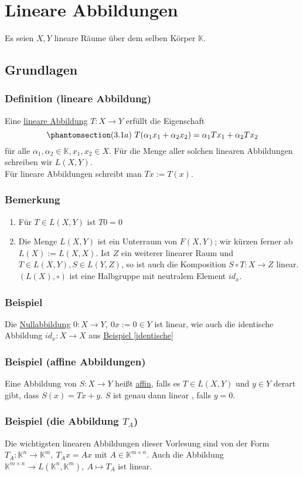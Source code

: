 \section{Lineare Abbildungen}
Es seien $X,Y$ lineare Räume über dem selben Körper $\mathbb{K}$.
\subsection{Grundlagen}
\subsubsection{Definition (lineare Abbildung)}
Eine \underline{lineare Abbildung} $T: X\rightarrow Y$ erfüllt die Eigenschaft
\[\phantomsection\label{3.1a}(3.1a)\ T(\alpha _1x_1+\alpha _2x_2)=\alpha _1Tx_1+\alpha _2Tx_2\]
für alle $\alpha _1,\alpha _2\in\mathbb{K},x_1,x_2\in X$.  Für die Menge aller solchen linearen Abbildungen schreiben wir $L(X,Y)$.\\
Für lineare Abbildungen schreibt man $Tx:=T(x)$.
\subsubsection{Bemerkung}
\renewcommand{\labelenumi}{(\arabic{enumi})}
\begin{enumerate}
\item Für $T\in L(X,Y)$ ist $T0=0$
\item Die Menge $L(X,Y)$ ist ein Unterraum von $F(X,Y)$; wir kürzen ferner ab $L(X):=L(X,X)$.  Ist $Z$ ein weiterer linearer Raum und $T\in L(X,Y),S\in L(Y,Z)$, so ist auch die Komposition $S\circ T:X\rightarrow Z$ linear. $(L(X),\circ )$ ist eine Halbgruppe mit neutralem Element $id_x$.
\end{enumerate}
\subsubsection{Beispiel}
Die \underline{Nullabbildung} $0:X\rightarrow Y,\ 0x:=0\in Y$ ist linear, wie auch die identische Abbildung $id_x:X\rightarrow X$ aus \hyperref[identische]{Beispiel \ref*{identische}}
\subsubsection{Beispiel (affine Abbildungen)}
Eine Abbildung von $S:X\rightarrow Y$ heißt \underline{affin}, falls es $T\in L(X,Y)$ und $y\in Y$ derart gibt, dass $S(x)=Tx+y$.  $S$ ist genau dann linear , falls $y=0$.
\subsubsection{Beispiel (die Abbildung $T_A$)}
\label{3.1.5}
Die wichtigsten linearen Abbildungen dieser Vorlesung sind von der Form $T_A:\mathbb{K}^n\rightarrow \mathbb{K}^m,\ T_Ax=Ax$ mit $A\in\mathbb{K}^{m\times n}$.  Auch die Abbildung $\mathbb{K}^{m\times n}\rightarrow L(\mathbb{K}^n,\mathbb{K}^m),\ A\mapsto T_A$ ist linear.
